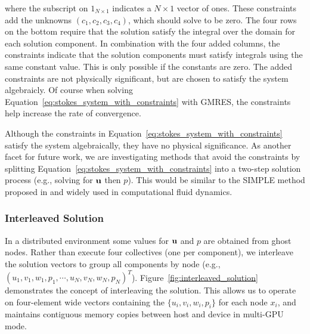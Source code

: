 where the subscript on $1_{N \times 1}$ indicates a $N \times 1$ vector of ones. These constraints add the unknowns $(c_1, c_2, c_3, c_4)$, which should solve to be zero. The four rows on the bottom require that the solution satisfy the integral over the domain for each solution component. In combination with the four added columns, the constraints indicate that the solution components must satisfy integrals using the same constant value. This is only possible if the constants are zero. The added constraints are not physically significant, but are chosen to satisfy the system algebraicly. Of course when solving Equation~\ref{eq:stokes_system_with_constraints} with GMRES, the constraints help increase the rate of convergence. 

Although the constraints in Equation~\ref{eq:stokes_system_with_constraints} satisfy the system algebraically, they have no physical significance. As another facet for future work, we are investigating methods that avoid the constraints by splitting Equation~\ref{eq:stokes_system_with_constraints} into a two-step solution process (e.g., solving for $\mathbf{u}$ then $p$). This would be similar to the SIMPLE method proposed in \cite{Patankar1972} and widely used in computational fluid dynamics. 


\subsubsection{Interleaved Solution}
%

In a distributed environment some values for $\mathbf{u}$ and $p$ are obtained from ghost nodes. Rather than execute four collectives (one per component), we interleave the solution vectors to group all components by node (e.g., $( u_1, v_1, w_1, p_1,\cdots, u_N, v_N, w_N, p_N)^T$). Figure~\ref{fig:interleaved_solution} demonstrates the concept of interleaving the solution. This allows us to operate on four-element wide vectors containing the $\{u_i, v_i, w_i, p_i\}$ for each node $x_i$, and maintains contiguous memory copies between host and device in multi-GPU mode. 


